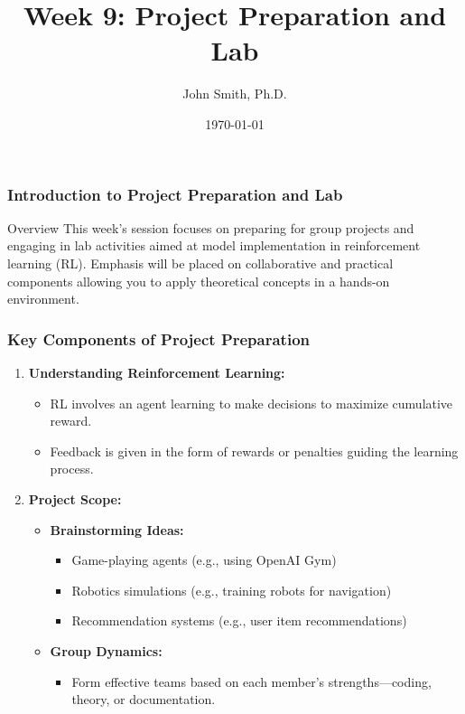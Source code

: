 \documentclass[aspectratio=169]{beamer}
\title[Week 9: Project Preparation and Lab]{Week 9: Project Preparation and Lab}
\author[J. Smith]{John Smith, Ph.D.}
\institute[University Name]{
  Department of Computer Science\\
  University Name\\
  \vspace{0.3cm}
  Email: email@university.edu\\
  Website: www.university.edu
}
\date{\today}
\begin{document}
\frame{\titlepage}

\begin{frame}[fragile]
    \frametitle{Introduction to Project Preparation and Lab}
    \begin{block}{Overview}
        This week’s session focuses on preparing for group projects and engaging in lab activities aimed at model implementation in reinforcement learning (RL). 
        Emphasis will be placed on collaborative and practical components allowing you to apply theoretical concepts in a hands-on environment.
    \end{block}
\end{frame}

\begin{frame}[fragile]
    \frametitle{Key Components of Project Preparation}
    \begin{enumerate}
        \item \textbf{Understanding Reinforcement Learning:}
        \begin{itemize}
            \item RL involves an agent learning to make decisions to maximize cumulative reward.
            \item Feedback is given in the form of rewards or penalties guiding the learning process.
        \end{itemize}
        
        \item \textbf{Project Scope:}
        \begin{itemize}
            \item \textbf{Brainstorming Ideas:}
            \begin{itemize}
                \item Game-playing agents (e.g., using OpenAI Gym)
                \item Robotics simulations (e.g., training robots for navigation)
                \item Recommendation systems (e.g., user item recommendations)
            \end{itemize}
            \item \textbf{Group Dynamics:}
            \begin{itemize}
                \item Form effective teams based on each member's strengths—coding, theory, or documentation.
            \end{itemize}
        \end{itemize}
    \end{enumerate}
\end{frame}
\end{document}
